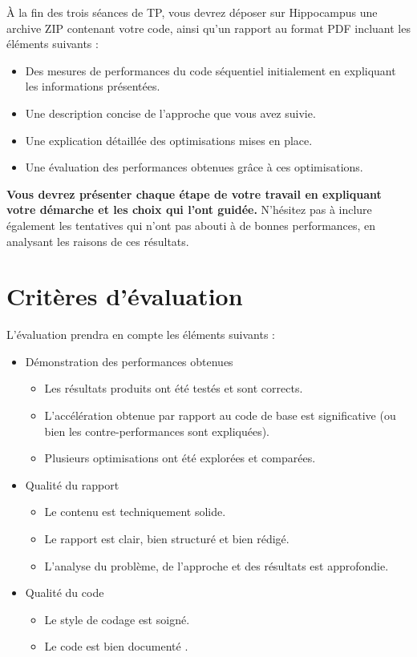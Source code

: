 \documentclass[11pt]{paper}
\begin{document}
À la fin des trois séances de TP, vous devrez déposer sur Hippocampus une archive ZIP contenant votre code, ainsi qu’un rapport au format PDF incluant les éléments suivants :
\begin{itemize}
	\item Des mesures de performances du code séquentiel initialement en expliquant les informations présentées.
	\item Une description concise de l’approche que vous avez suivie.
	\item Une explication détaillée des optimisations mises en place.
	\item Une évaluation des performances obtenues grâce à ces optimisations.
\end{itemize}
\medskip

{\bf Vous devrez présenter chaque étape de votre travail en expliquant votre démarche et les choix qui l’ont guidée.} N’hésitez pas à inclure également les tentatives qui n’ont pas abouti à de bonnes performances, en analysant les raisons de ces résultats.
\medskip

\section*{Critères d'évaluation}

L’évaluation prendra en compte les éléments suivants :
\begin{itemize}
	\item Démonstration des performances obtenues
	\begin{itemize}
		\item Les résultats produits ont été testés et sont corrects.
		\item L’accélération obtenue par rapport au code de base est significative (ou bien les contre-performances sont expliquées).
		\item Plusieurs optimisations ont été explorées et comparées.
	\end{itemize}

	\item Qualité du rapport
	\begin{itemize}
		\item Le contenu est techniquement solide.
		\item Le rapport est clair, bien structuré et bien rédigé.
		\item L’analyse du problème, de l’approche et des résultats est approfondie.
	\end{itemize}
	
	\item Qualité du code
	\begin{itemize}
		\item Le  style de codage est soigné.
		\item Le code est bien documenté .
	\end{itemize}
\end{itemize}
\end{document}
